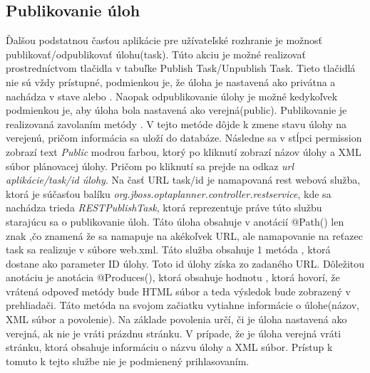 \subsection{Publikovanie úloh}
Ďalšou podstatnou časťou aplikácie pre užívateľské rozhranie je možnosť publikovať/odpublikovať úlohu(task). Túto akciu je možné realizovať prostredníctvom tlačidla v tabuľke Publish Task/Unpublish Task. Tieto tlačidlá nie sú vždy prístupné, podmienkou je, že úloha je nastavená ako privátna a nachádza v stave  alebo . Naopak odpublikovanie úlohy je možné kedykoľvek podmienkou je, aby úloha bola nastavená ako verejná(public). Publikovanie je realizovaná zavolaním metódy . V tejto metóde dôjde k zmene stavu úlohy na verejenú, pričom informácia sa uloží do databáze. Následne sa v stĺpci permission zobrazí text \emph{Public} modrou farbou, ktorý po kliknutí zobrazí názov úlohy a XML súbor plánovacej úlohy. Pričom po kliknutí sa prejde na odkaz \emph{url aplikácie/task/id úlohy}. Na časť URL task/id je namapovaná rest webová služba, ktorá je súčasťou balíku \emph{org.jboss.optaplanner.controller.restservice}, kde sa nachádza trieda \emph{RESTPublishTask}, ktorá reprezentuje práve túto službu starajúcu sa o publikovanie úloh. Táto úloha obsahuje v anotácií @Path() len znak \uv{/},čo znamená že sa namapuje na akékoľvek URL, ale namapovanie na reťazec task sa realizuje v súbore web.xml. Táto služba obsahuje 1 metóda , ktorá dostane ako parameter ID úlohy. Toto id úlohy získa zo zadaného URL. Dôležitou anotáciu je anotácia @Produces(), ktorá obsahuje hodnotu , ktorá hovorí, že vrátená odpoveď metódy bude HTML súbor a teda výsledok bude zobrazený v prehliadači. Táto metóda na svojom začiatku vytiahne informácie o úlohe(názov, XML súbor a povolenie). Na základe povolenia určí, či je úloha nastavená ako verejná, ak nie je vráti prázdnu stránku. V prípade, že je úloha verejná vráti stránku, ktorá obsahuje informáciu o názvu úlohy a XML súbor. Prístup k tomuto k tejto službe nie je podmienený prihlasovaním.


